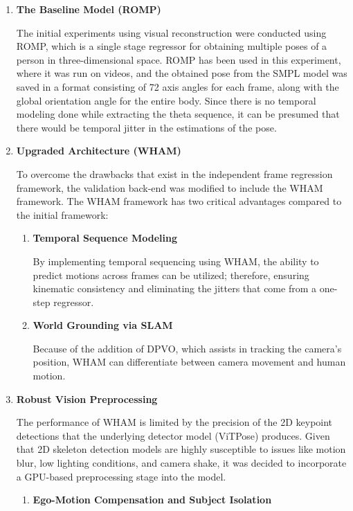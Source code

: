 \documentclass[12pt, a4paper, oneside]{report}
\begin{document}
\begin{enumerate}
    \item \textbf{The Baseline Model (ROMP)}

    The initial experiments using visual reconstruction were conducted using ROMP, which is a single stage regressor for obtaining multiple poses of a person in three-dimensional space. ROMP has been used in this experiment, where it was run on videos, and the obtained pose from the SMPL model was saved in a format consisting of 72 axis angles for each frame, along with the global orientation angle for the entire body. Since there is no temporal modeling done while extracting the theta sequence, it can be presumed that there would be temporal jitter in the estimations of the pose.

    \item \textbf{Upgraded Architecture (WHAM)}

    To overcome the drawbacks that exist in the independent frame regression framework, the validation back-end was modified to include the WHAM framework. The WHAM framework has two critical advantages compared to the initial framework:

    \begin{enumerate}
        \item \textbf{Temporal Sequence Modeling}

        By implementing temporal sequencing using WHAM, the ability to predict motions across frames can be utilized; therefore, ensuring kinematic consistency and eliminating the jitters that come from a one-step regressor.

        \item \textbf{World Grounding via SLAM}

        Because of the addition of DPVO, which assists in tracking the camera's position, WHAM can differentiate between camera movement and human motion.
    \end{enumerate}

    \item \textbf{Robust Vision Preprocessing}

    The performance of WHAM is limited by the precision of the 2D keypoint detections that the underlying detector model (ViTPose) produces. Given that 2D skeleton detection models are highly susceptible to issues like motion blur, low lighting conditions, and camera shake, it was decided to incorporate a GPU-based preprocessing stage into the model.

    \begin{enumerate}
        \item \textbf{Ego-Motion Compensation and Subject Isolation}


\end{enumerate}
\end{enumerate}
\end{document}

